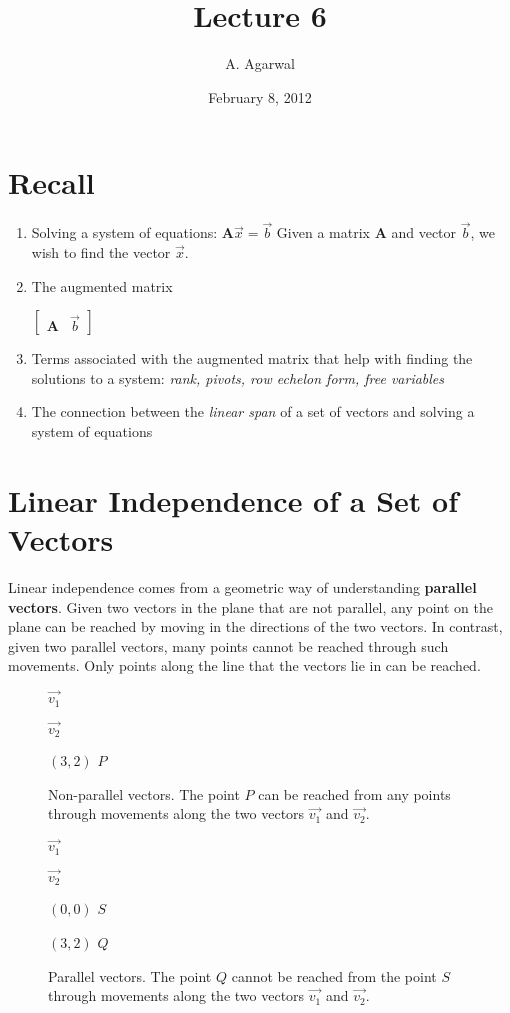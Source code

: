 \documentclass[11pt]{article}
\title{Lecture 6}
\author{A. Agarwal}
\date{February 8, 2012}
\newcommand{\keyphrase}{\textbf}
\newcommand{\mat}[1]{\mathbf{#1}}
\newcommand{\vek}[1]{\vec{#1}}
\begin{document}

\section*{Recall}

\begin{enumerate}
\item{
Solving a system of equations:
$\mat{A} \vek{x} = \vek{b}$
Given a matrix $\mat{A}$ and vector $\vek{b}$, we wish to find the vector $\vek{x}$.
}
\item{
The augmented matrix

$\left[
\begin{matrix}
\mat{A} & \vek{b}
\end{matrix}
\right]$
}
\item{
Terms associated with the augmented matrix that help with finding the solutions to a system: \emph{rank, pivots, row echelon form, free variables}
}
\item{
The connection between the \emph{linear span} of a set of vectors and solving a system of equations
}
\end{enumerate}

\section*{Linear Independence of a Set of Vectors}

Linear independence comes from a geometric way of understanding \keyphrase{parallel vectors}. Given two vectors in the plane that are not parallel, any point on the plane can be reached by moving in the directions of the two vectors. In contrast, given two parallel vectors, many points cannot be reached through such movements. Only points along the line that the vectors lie in can be reached.

\begin{figure}
\centering
$\vek{v_1}$

$\vek{v_2}$

$(3,2)$ $P$
\caption{Non-parallel vectors. The point $P$ can be reached from any points through movements along the two vectors $\vek{v_1}$ and $\vek{v_2}$.}
\end{figure}

\begin{figure}

$\vek{v_1}$

$\vek{v_2}$

$(0,0)$ $S$

$(3,2)$ $Q$
\caption{Parallel vectors. The point $Q$ cannot be reached from the point $S$ through movements along the two vectors $\vek{v_1}$ and $\vek{v_2}$.}
\end{figure}
\end{document}
